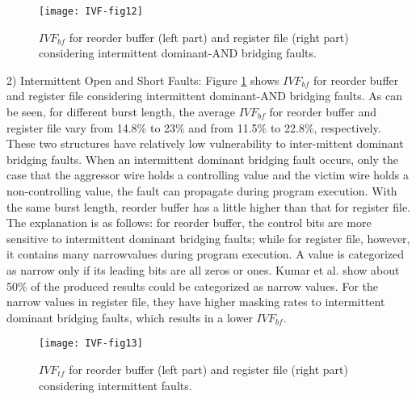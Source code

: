 \begin{figure}[t]
    \centering
    \texttt{[image: IVF-fig12]}\\
    \caption{$IVF_{bf}$ for reorder buffer (left part) and register file (right part) considering intermittent dominant-AND bridging faults.}
    \label{fig:IVF-and}
\end{figure}

2) Intermittent Open and Short Faults: Figure \ref{fig:IVF-and} shows $IVF_{bf}$ for reorder buffer and register file considering intermittent dominant-AND bridging faults. As can be seen, for different burst length, the average $IVF_{bf}$ for reorder buffer and register file vary from 14.8\% to 23\% and from 11.5\% to 22.8\%, respectively. These two structures have relatively low vulnerability to inter-mittent dominant bridging faults. When an intermittent dominant bridging fault occurs, only the case that the aggressor wire holds a controlling value and the victim wire holds a non-controlling value, the fault can propagate during program execution. With the same burst length, reorder buffer has a little higher than that for register file. The explanation is as follows: for reorder buffer, the control bits are more sensitive to intermittent dominant bridging faults; while for register file, however, it contains many narrowvalues during program execution. A value is categorized as narrow only if its leading bits are all zeros or ones. Kumar et al. \cite{kumar2006reducing} show about 50\% of the produced results could be categorized as narrow values. For the narrow values in register file, they have higher masking rates to intermittent dominant bridging faults, which results in a lower $IVF_{bf}$.

\begin{figure}[t]
    \centering
    \texttt{[image: IVF-fig13]}\\
    \caption{$IVF_{tf}$ for reorder buffer (left part) and register file (right part) considering intermittent faults.}
    \label{fig:IVF-tf}
\end{figure}


